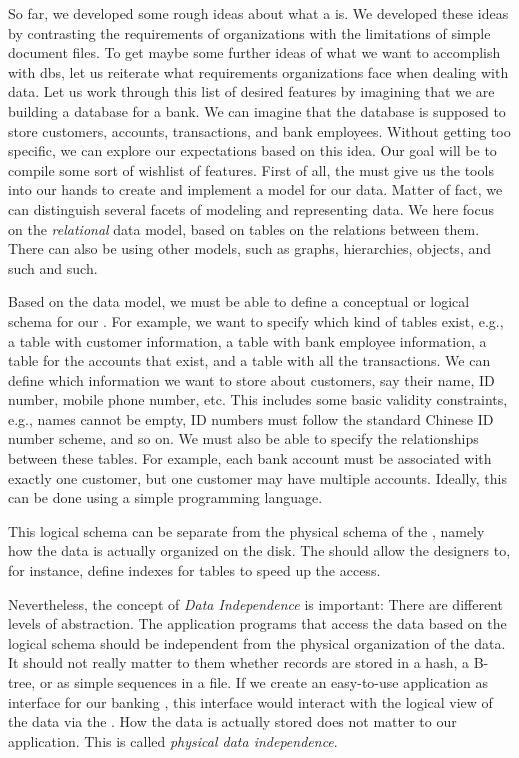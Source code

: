 %
\label{sec:features}%
%
So far, we developed some rough ideas about what a  is.
We developed these ideas by contrasting the requirements of organizations with the limitations of simple document files.
To get maybe some further ideas of what we want to accomplish with \glspl{db}, let us reiterate what requirements organizations face when dealing with data.
Let us work through this list of desired features by imagining that we are building a database for a bank.
We can imagine that the database is supposed to store customers, accounts, transactions, and bank employees.
Without getting too specific, we can explore our expectations based on this idea.
Our goal will be to compile some sort of wishlist of features.%
%
%
First of all, the  must give us the tools into our hands to create and implement a model for our data.
Matter of fact, we can distinguish several facets of modeling and representing data.
We here focus on the \emph{relational} data model, based on tables on the relations between them.
There can also be  using other models, such as graphs, hierarchies, objects, and such and such.

Based on the data model, we must be able to define a conceptual or logical schema for our .
For example, we want to specify which kind of tables exist, e.g., a table with customer information, a table with bank employee information, a table for the accounts that exist, and a table with all the transactions.
We can define which information we want to store about customers, say their name, ID number, mobile phone number, etc.
This includes some basic validity constraints, e.g., names cannot be empty, ID numbers must follow the standard Chinese ID number scheme, and so on.
We must also be able to specify the relationships between these tables.
For example, each bank account must be associated with exactly one customer, but one customer may have multiple accounts.
Ideally, this can be done using a simple programming language.

This logical schema can be separate from the physical schema of the , namely how the data is actually organized on the disk.
The  should allow the  designers to, for instance, define indexes for tables to speed up the access.

Nevertheless, the concept of \emph{Data Independence} is important:
There are different levels of abstraction.
The application programs that access the data based on the logical schema should be independent from the physical organization of the data.
It should not really matter to them whether records are stored in a hash, a B-tree, or as simple sequences in a file.
If we create an easy-to-use application as interface for our banking , this interface would interact with the logical view of the data via the .
How the data is actually stored does not matter to our application.
This is called \emph{physical data independence}.

